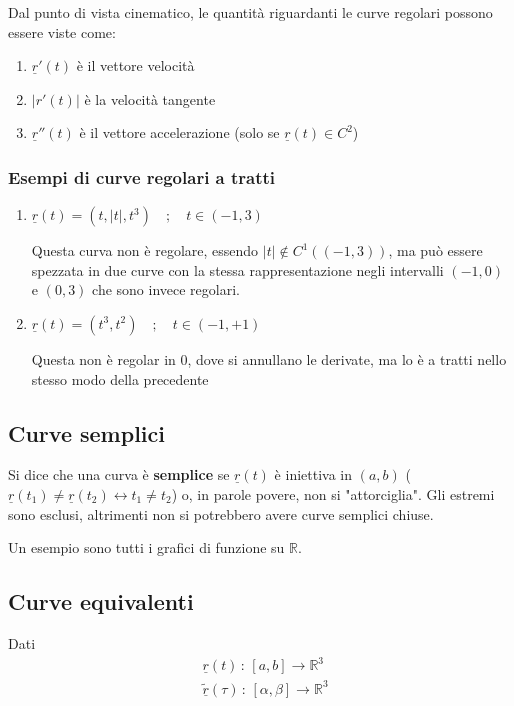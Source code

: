 Dal punto di vista cinematico, le quantità riguardanti le curve regolari possono essere viste come:

\begin{enumerate}
	\item $\underline{r}'(t)$ è il vettore velocità
	\item $|r'(t)|$ è la velocità tangente
	\item $\underline{r}''(t)$ è il vettore accelerazione (solo se $\underline{r}(t)\in C^2$)
\end{enumerate}

\subsubsection{Esempi di curve regolari a tratti}

\begin{enumerate}
	\item $\underline{r}(t)=(t,|t|, t^3) \quad ; \quad t\in(-1,3)$
	
	Questa curva non è regolare, essendo $|t|\notin C^1((-1,3))$, ma può essere spezzata in due curve con la stessa rappresentazione negli intervalli $(-1,0)$ e $(0,3)$
	che sono invece regolari.
	
	\item $\underline{r}(t)=(t^3,t^2) \quad ; \quad t\in(-1,+1)$ 
	
	Questa non è regolar in 0, dove si annullano le derivate, ma lo è a tratti nello stesso modo della precedente 
\end{enumerate}


\subsection{Curve semplici}
	
	Si dice che una curva è \textbf{semplice} se $\underline{r}(t)$ è iniettiva in $(a,b)$ ($\underline{r}(t_1) \neq \underline{r}(t_2) \leftrightarrow t_1 \neq t_2$) o, in parole povere, non si "attorciglia". Gli estremi sono esclusi, altrimenti non si potrebbero avere curve semplici chiuse.
	
	Un esempio sono tutti i grafici di funzione su $\mathbb{R}$.
	
\subsection{Curve equivalenti}

Dati
\begin{align}
&\underline{r}(t) \, : \, [a,b] \longrightarrow \mathbb{R}^3 \\
&\tilde{\underline{r}}(\tau) \, : \, [\alpha,\beta] \longrightarrow \mathbb{R}^3
\end{align}

